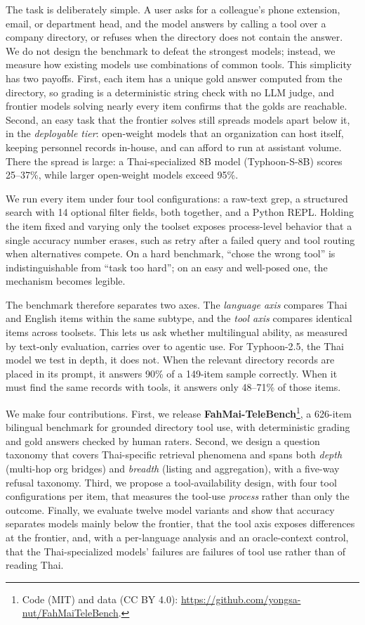 \documentclass[11pt]{article}
\begin{document}
The task is deliberately simple. A user asks for a colleague's phone extension, email, or department
head, and the model answers by calling a tool over a company directory, or refuses when the directory
does not contain the answer. We do not design the benchmark to defeat the strongest models; instead, we
measure how existing models use combinations of common tools. This simplicity has two payoffs. First, each item
has a unique gold answer computed from the directory, so grading is a deterministic string check with no
LLM judge, and frontier models solving nearly every item confirms that the golds are reachable. Second,
an easy task that the frontier solves still spreads models apart below it, in the \emph{deployable
tier}: open-weight models that an organization can host itself, keeping personnel records in-house, and
can afford to run at assistant volume. There the spread is large: a Thai-specialized 8B model (Typhoon-S-8B) scores 25--37\%, while
larger open-weight models exceed 95\%.

We run every item under four tool configurations: a raw-text grep, a structured search with 14 optional
filter fields, both together, and a Python REPL. Holding the item fixed and varying only the toolset
exposes process-level behavior that a single accuracy number erases, such as retry after a failed query
and tool routing when alternatives compete. On a hard benchmark, ``chose the wrong tool'' is
indistinguishable from ``task too hard''; on an easy and well-posed one, the mechanism becomes legible.

The benchmark therefore separates two axes. The \emph{language axis} compares Thai and English items
within the same subtype, and the \emph{tool axis} compares identical items across toolsets. This lets us
ask whether multilingual ability, as measured by text-only evaluation, carries over to agentic use. For
Typhoon-2.5, the Thai model we test in depth, it does not. When the relevant directory records are
placed in its prompt, it answers 90\% of a 149-item sample correctly. When it must find the same records
with tools, it answers only 48--71\% of those items.

We make four contributions. First, we release
\textbf{FahMai-TeleBench}\footnote{Code (MIT) and data (CC BY 4.0): \url{https://github.com/yongsa-nut/FahMaiTeleBench}.}, a
626-item bilingual benchmark for grounded directory tool use, with deterministic grading and gold answers
checked by human raters. Second, we design a question taxonomy that covers Thai-specific retrieval
phenomena and spans both \emph{depth} (multi-hop org bridges) and \emph{breadth} (listing and
aggregation), with a five-way refusal taxonomy. Third, we propose a tool-availability design, with four
tool configurations per item, that measures the tool-use \emph{process} rather than only the outcome.
Finally, we evaluate twelve model variants and show that accuracy separates models mainly below the
frontier, that the tool axis exposes differences at the frontier, and, with a per-language analysis and
an oracle-context control, that the Thai-specialized models' failures are failures of tool use rather
than of reading Thai.
\end{document}
